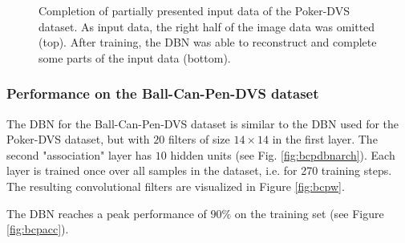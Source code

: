 \begin{figure}[h!]
\begin{subfigure}{.25\textwidth}
  		\label{fig:sub1}
	\end{subfigure}%
	\caption[Completion of partially presented input data of the Poker-DVS dataset.]{Completion of partially presented input data of the Poker-DVS dataset. As input data, the right half of the image data was omitted (top). After training, the DBN was able to reconstruct and complete some parts of the input data (bottom).}
	\label{fig:pokercompl}
\end{figure}

\clearpage

\subsubsection{Performance on the Ball-Can-Pen-DVS dataset} \label{c:pokerexp}

The DBN for the Ball-Can-Pen-DVS dataset is similar to the DBN used for the Poker-DVS dataset, but with $20$ filters of size $14 \times 14$ in the first layer. The second "association" layer has $10$ hidden units (see Fig. \ref{fig:bcpdbnarch}).
Each layer is trained once over all samples in the dataset, i.e. for 270 training steps. 
The resulting convolutional filters are visualized in Figure \ref{fig:bcpw}.

The DBN reaches a peak performance of $90 \%$ on the training set (see Figure \ref{fig:bcpacc}). 

